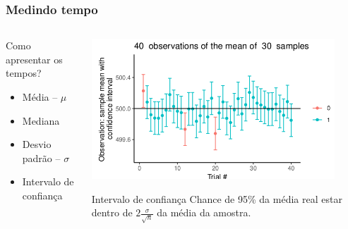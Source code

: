 \documentclass[xcolor={usenames,dvipsnames},12pt,presentation,aspectratio=169]{beamer}
\begin{document}
\begin{frame}[fragile]
  \frametitle{Medindo tempo}
  \vspace{-4mm}  
  \begin{columns}
      \begin{column}{0.3\textwidth}
        Como apresentar os tempos?
        \begin{itemize}
          \item Média -- $\mu$
          \item Mediana 
          \item Desvio padrão -- $\sigma$
          \item Intervalo de confiança
        \end{itemize}    
      \end{column}
      \begin{column}{0.7\textwidth}
        \begin{center}
          \includegraphics[width=0.9\textwidth]{CI_illustration.png}
          \end{center}       
          \vspace{-3mm}  
          \begin{block}{Intervalo de confiança}
            Chance de 95\% da média real estar dentro de $2\frac{\sigma}{\sqrt{n}}$ da média da amostra.
          \end{block}
      \end{column}
    \end{columns}
\end{frame}
\end{document}
